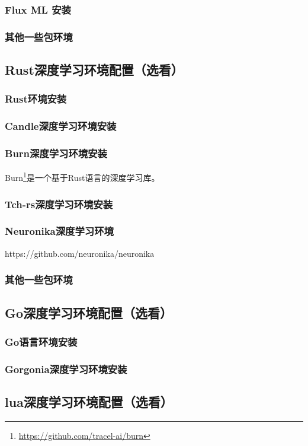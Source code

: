 \documentclass[lang=cn,a4paper,newtx]{elegantpaper}
\begin{document}
\subsubsection{Flux ML 安装}
\subsubsection{其他一些包环境}
\subsection{Rust深度学习环境配置（选看）}
\subsubsection{Rust环境安装}
\subsubsection{Candle深度学习环境安装}
\subsubsection{Burn深度学习环境安装}
Burn\footnote{\url{https://github.com/tracel-ai/burn}}是一个基于Rust语言的深度学习库。
\subsubsection{Tch-rs深度学习环境安装}
\subsubsection{Neuronika深度学习环境}
https://github.com/neuronika/neuronika
\subsubsection{其他一些包环境}
\subsection{Go深度学习环境配置（选看）}
\subsubsection{Go语言环境安装}
\subsubsection{Gorgonia深度学习环境安装}
\subsection{lua深度学习环境配置（选看）}
\end{document}
